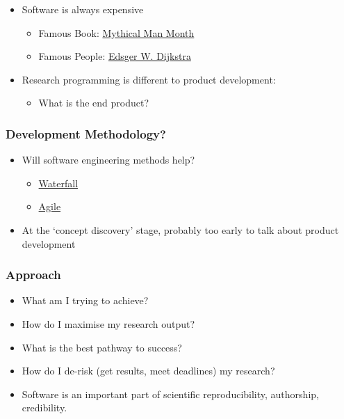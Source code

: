 \begin{itemize}
\itemsep1pt\parskip0pt
\item
  Software is always expensive

  \begin{itemize}
  \itemsep1pt\parskip0pt
  \item
    Famous Book:
    \href{http://www.amazon.co.uk/Mythical-Man-month-Essays-Software-Engineering/dp/0201835959/ref=sr_1_1?ie=UTF8\&qid=1452507457\&sr=8-1\&keywords=mythical+man+month}{Mythical
    Man Month}
  \item
    Famous People: \href{https://www.cs.utexas.edu/users/EWD/}{Edsger W.
    Dijkstra}
  \end{itemize}
\item
  Research programming is different to product development:

  \begin{itemize}
  \itemsep1pt\parskip0pt
  \item
    What is the end product?
  \end{itemize}
\end{itemize}

\subsubsection{Development Methodology?}\label{development-methodology}

\begin{itemize}
\itemsep1pt\parskip0pt
\item
  Will software engineering methods help?

  \begin{itemize}
  \itemsep1pt\parskip0pt
  \item
    \href{https://en.wikipedia.org/wiki/Waterfall_model}{Waterfall}
  \item
    \href{https://en.wikipedia.org/wiki/Agile_software_development}{Agile}
  \end{itemize}
\item
  At the `concept discovery' stage, probably too early to talk about
  product development
\end{itemize}

\subsubsection{Approach}\label{approach}

\begin{itemize}
\itemsep1pt\parskip0pt
\item
  What am I trying to achieve?
\item
  How do I maximise my research output?
\item
  What is the best pathway to success?
\item
  How do I de-risk (get results, meet deadlines) my research?
\item
  Software is an important part of scientific reproducibility,
  authorship, credibility.
\end{itemize}


